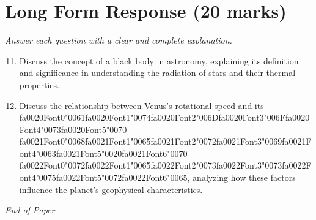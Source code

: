 \documentclass[12pt]{article}
\begin{document}
\section*{Long Form Response (20 marks)}
\textit{Answer each question with a clear and complete explanation.}
\begin{enumerate}[label=\arabic*.]
\setcounter{enumi}{10}
\item Discuss the concept of a black body in astronomy, explaining its definition and
significance in understanding the radiation of stars and their thermal properties.
\item Discuss the relationship between Venus's rotational speed and its {\csname fa0020Font0\endcsname\char"0061}{\csname fa0020Font1\endcsname\char"0074}{\csname fa0020Font2\endcsname\char"006D}{\csname fa0020Font3\endcsname\char"006F}{\csname fa0020Font4\endcsname\char"0073}{\csname fa0020Font5\endcsname\char"0070} {\csname fa0021Font0\endcsname\char"0068}{\csname fa0021Font1\endcsname\char"0065}{\csname fa0021Font2\endcsname\char"0072}{\csname fa0021Font3\endcsname\char"0069}{\csname fa0021Font4\endcsname\char"0063}{\csname fa0021Font5\endcsname\char"0020}{\csname fa0021Font6\endcsname\char"0070} {\csname fa0022Font0\endcsname\char"0072}{\csname fa0022Font1\endcsname\char"0065}{\csname fa0022Font2\endcsname\char"0073}{\csname fa0022Font3\endcsname\char"0073}{\csname fa0022Font4\endcsname\char"0075}{\csname fa0022Font5\endcsname\char"0072}{\csname fa0022Font6\endcsname\char"0065},
analyzing how these factors influence the planet's geophysical characteristics.
\end{enumerate}

\vfill
\noindent\textit{End of Paper}
\end{document}
